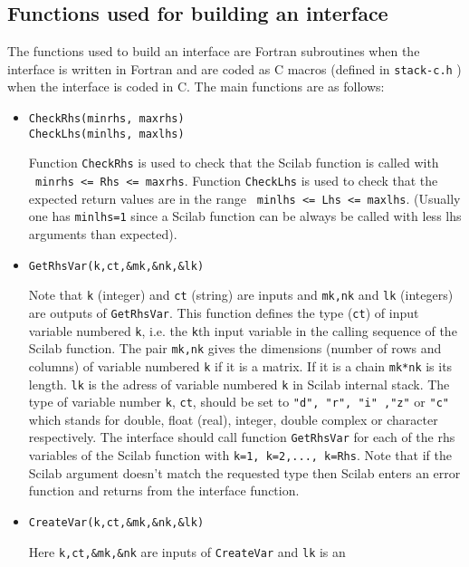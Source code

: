\subsection{Functions used for building an interface}
The functions used to build an interface are Fortran subroutines when 
the interface is written in Fortran and are coded as C macros 
(defined in {\tt  stack-c.h} ) 
when the interface is coded in C. The main functions are as follows:

\begin{itemize}
\item{
\begin{verbatim}
CheckRhs(minrhs, maxrhs)
CheckLhs(minlhs, maxlhs)
\end{verbatim}
Function \verb!CheckRhs! is used to check that the Scilab function is called
with \\
{\verb! minrhs <= Rhs <= maxrhs!}. 
Function \verb!CheckLhs! is used to check that the expected return
values are in the range 
{\verb! minlhs <= Lhs <= maxlhs!}. (Usually one has {\tt minlhs=1}
since a Scilab function can be always be called with less lhs
arguments than expected).
}
\item{
\begin{verbatim}
GetRhsVar(k,ct,&mk,&nk,&lk)
\end{verbatim}
Note that \verb!k! (integer) and \verb!ct! (string) are inputs and 
\verb!mk,nk! and \verb!lk! (integers) are outputs of \verb!GetRhsVar!.
This function defines the type (\verb!ct!) of input variable numbered
\verb!k!, i.e. the \verb!k!th input variable in the calling sequence of the 
Scilab function. The pair \verb!mk,nk! gives the dimensions (number of rows
and columns)  of variable numbered \verb!k! if it is a matrix. 
If it is a chain \verb!mk*nk! is its length. \verb!lk! is the adress
of variable numbered \verb!k! in Scilab internal stack.
The type of variable number \verb!k!, \verb!ct!, should be set 
to {\tt "d", "r", "i" ,"z"} or {\tt "c"} which stands for double, float
(real), integer, double complex 
or character respectively. The interface should call function
\verb!GetRhsVar! for each of the rhs variables of the Scilab function
with {\tt k=1, k=2,..., k=Rhs}.
Note that if the Scilab argument doesn't match the requested type then 
Scilab enters an error function and returns from the interface function.
}
\item{
\begin{verbatim}
CreateVar(k,ct,&mk,&nk,&lk)
\end{verbatim}
Here \verb!k,ct,&mk,&nk! are inputs of \verb!CreateVar! and \verb!lk! is an
}
\end{itemize}
